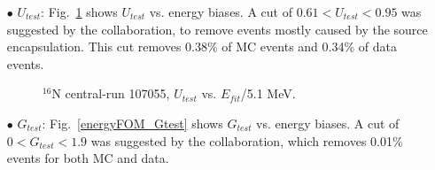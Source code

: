 \begin{itemize}
	\item[$\bullet$]$U_{test}$:
	Fig.~\ref{energyFOM_Utest} shows $U_{test}$ vs. energy biases. A cut of $0.61<U_{test}<0.95$ was suggested by the collaboration, to remove events mostly caused by the source encapsulation. This cut removes 0.38\% of MC events and 0.34\% of data events.

	\begin{figure}[!htb]
		\centering
		\caption{$^{16}$N central-run 107055, $U_{test}$ vs. $E_{fit}$/5.1 MeV.\label{energyFOM_Utest}}
		
	\end{figure}
	
	\item[$\bullet$] $G_{test}$: Fig.~\ref{energyFOM_Gtest} shows $G_{test}$ vs. energy biases. A cut of $0<G_{test}<1.9$ was suggested by the collaboration, which removes 0.01\% events for both MC and data.	
	

\end{itemize}
